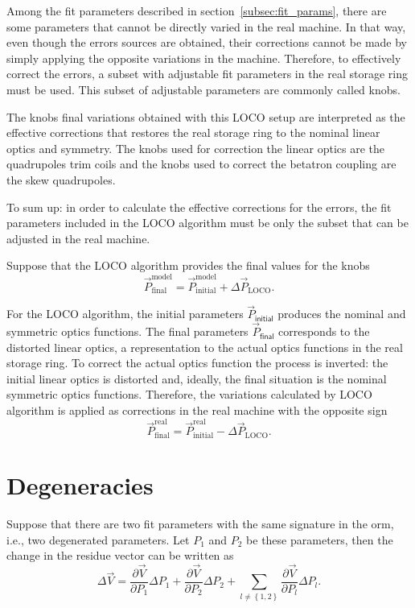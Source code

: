 Among the fit parameters described in section~\ref{subsec:fit_params}, there are some parameters that cannot be directly varied in the real machine. In that way, even though the errors sources are obtained, their corrections cannot be made by simply applying the opposite variations in the machine. Therefore, to effectively correct the errors, a subset with adjustable fit parameters in the real storage ring must be used. This subset of adjustable parameters are commonly called knobs.

The knobs final variations obtained with this LOCO setup are interpreted as the effective corrections that restores the real storage ring to the nominal linear optics and symmetry. The knobs used for correction the linear optics are the quadrupoles trim coils and the knobs used to correct the betatron coupling are the skew quadrupoles. 

To sum up: in order to calculate the effective corrections for the errors, the fit parameters included in the LOCO algorithm must be only the subset that can be adjusted in the real machine.

Suppose that the LOCO algorithm provides the final values for the knobs
\begin{equation}
    \vec{P}_{\mathrm{final}}^{\mathrm{model}} = \vec{P}_{\mathrm{initial}}^{\mathrm{model}} + \Delta\vec{P}_{\mathrm{LOCO}}.
\end{equation}

For the LOCO algorithm, the initial parameters $\vec{P}_{\mathsf{initial}}$ produces the nominal and symmetric optics functions. The final parameters $\vec{P}_{\mathsf{final}}$ corresponds to the distorted linear optics, a representation to the actual optics functions in the real storage ring. To correct the actual optics function the process is inverted: the initial linear optics is distorted and, ideally, the final situation is the nominal symmetric optics functions. Therefore, the variations calculated by LOCO algorithm is applied as corrections in the real machine with the opposite sign
\begin{equation}
    \vec{P}_{\mathrm{final}}^{\mathrm{real}} = \vec{P}_{\mathrm{initial}}^{\mathrm{real}} - \Delta\vec{P}_{\mathrm{LOCO}}.
\end{equation}
\section{Degeneracies}\label{sec:degeneracy}
Suppose that there are two fit parameters with the same signature in the \gls{orm}, i.e., two degenerated parameters. Let $P_1$ and $P_2$ be these parameters, then the change in the residue vector can be written as
\begin{equation}
\Delta \vec{V} = \dfrac{\partial \vec{V}}{\partial P_{1}} \Delta P_{1} + \dfrac{\partial \vec{V}}{\partial P_{2}} \Delta P_{2} + \sum_{l \neq \left\{1,2\right\}}\dfrac{\partial \vec{V}}{\partial P_{l}} \Delta P_{l}.
\end{equation}


